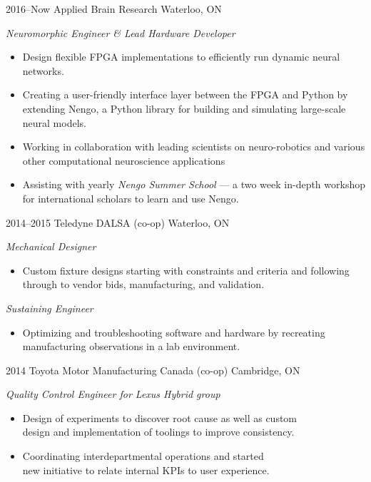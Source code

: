 \documentclass[a4paper,nocolors]{cv-friggeri-ben}
\begin{document}
\begin{entrylist}

\entry
    {2016--Now}
    {Applied Brain Research}
    {Waterloo, ON}
    {\emph{Neuromorphic Engineer \& Lead Hardware Developer}
    \begin{itemize}
        \item Design flexible FPGA implementations to efficiently run dynamic neural networks.
        \item Creating a user-friendly interface layer between the FPGA and Python by extending Nengo, a Python library for building and simulating large-scale neural models.
        \item Working in collaboration with leading scientists on neuro-robotics and various other computational neuroscience applications
        \item Assisting with yearly \emph{Nengo Summer School} --- a two week in-depth workshop for international scholars to learn and use Nengo.
    \end{itemize}}

\entry
    {2014--2015}
    {Teledyne DALSA {\normalfont (co-op)}}
    {Waterloo, ON}
    {\emph{Mechanical Designer}
    \begin{itemize}
        \item Custom fixture designs starting with constraints and criteria and following through to vendor bids, manufacturing, and validation.
    \end{itemize}
    \emph{Sustaining Engineer}
    \begin{itemize}
        \item Optimizing and troubleshooting software and hardware by recreating manufacturing observations in a lab environment.
    \end{itemize}}

\entry
    {2014}
    {Toyota Motor Manufacturing Canada {\normalfont (co-op)}}
    {Cambridge, ON}
    {\emph{Quality Control Engineer for Lexus Hybrid group}
    \begin{itemize}
        \item Design of experiments to discover root cause as well as custom\\ design and implementation of toolings to improve consistency.
        \item Coordinating interdepartmental operations and started \\new initiative to relate internal KPIs to user experience.
    \end{itemize}}

\end{entrylist}  %
\end{document}
